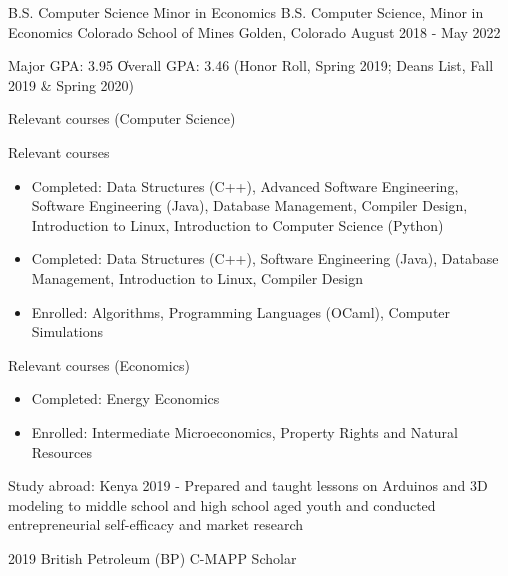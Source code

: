\vspace{-2.0mm}


\begin{cventries}

  \cventry
    {\ifcv B.S. Computer Science \newline \vspace{-1mm} Minor in Economics \else B.S. Computer Science, Minor in Economics \fi}
    {Colorado School of Mines} %
    {Golden, Colorado} %
    {August 2018 - May 2022} %
    {
      \begin{cvitems} %
        \item {Major GPA: 3.95 \| Overall GPA: 3.46 (Honor Roll, Spring 2019; Deans
    List, Fall 2019 \& Spring 2020)}
        \ifcv
        \item {Relevant courses (Computer Science)}
        \else
        \item {Relevant courses}
        \fi
        \begin {itemize}
        \ifcv
               \item {Completed: Data Structures (C++), Advanced Software Engineering, Software
    Engineering (Java), Database Management, Compiler Design, Introduction to Linux, Introduction to Computer Science (Python)}
    \else
    \item {Completed: Data Structures (C++), Software
    Engineering (Java), Database Management, Introduction to Linux, Compiler Design}
    \fi
        \item {Enrolled: Algorithms, Programming Languages (OCaml), Computer Simulations}
        \end {itemize}
        \ifcv
        \item {Relevant courses (Economics)}
        \begin{itemize}
          \item Completed: Energy Economics
          \item Enrolled: Intermediate Microeconomics, Property Rights and Natural Resources
        \end{itemize}
        \fi
    \ifcv
\item {Study abroad: Kenya 2019 - Prepared and taught lessons on Arduinos and 3D modeling to
middle school and high school aged youth and conducted entrepreneurial self-efficacy and market research }
\fi
\item {2019 British Petroleum (BP) C-MAPP Scholar}
      \end{cvitems}
    }
    {}
\end{cventries}

